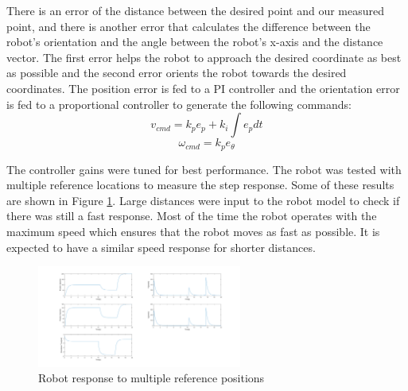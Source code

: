 There is an error of the distance between the desired point and our measured point, and there is another error that calculates the difference between the robot’s orientation and the angle between the robot’s x-axis and the distance vector. The first error helps the robot to approach the desired coordinate as best as possible and the second error orients the robot towards the desired coordinates. The position error is fed to a PI controller and the orientation error is fed to a proportional controller to generate the following commands:
\begin{equation}
    v_{cmd} = k_p e_p + k_i \int e_p dt 
\end{equation}
\begin{equation}
    \omega_{cmd} = k_p e_{\theta}
\end{equation}

The controller gains were tuned for best performance. The robot was tested with multiple reference locations to measure the step response. Some of these results are shown in Figure \ref{robot_resp}. Large distances were input to the robot model to check if there was still a fast response. Most of the time the robot operates with the maximum speed which ensures that the robot moves as fast as possible. It is expected to have a similar speed response for shorter distances.

\begin{figure}[thb]
    \centering
    \includegraphics[width=0.6\textwidth]{images/robot_response.png}
    \caption{Robot response to multiple reference positions}\label{robot_resp}
\end{figure}